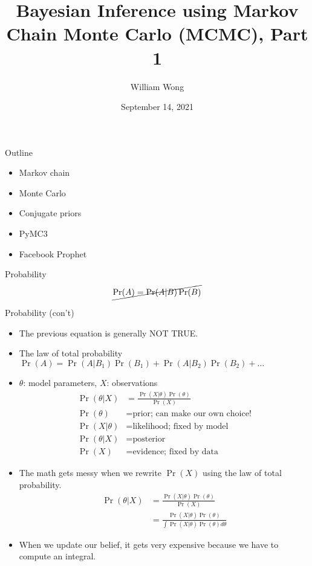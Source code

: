 \documentclass[20pt]{beamer}
\title{Bayesian Inference using Markov Chain Monte Carlo (MCMC), Part 1}
\date{September 14, 2021}
\author{William Wong}
\begin{document}
\begin{frame}
  \titlepage
\end{frame}



\begin{frame}{Outline}
\begin{itemize}
\item Markov chain

\item Monte Carlo

\item Conjugate priors

\item PyMC3

\item Facebook Prophet
\end{itemize}
\end{frame}



\begin{frame}{Probability}
\begin{align*}
  \cancel{\Pr( A ) = \Pr(A | B) \Pr(B)}
\end{align*}
\end{frame}


\begin{frame}{Probability (con't)}
\begin{itemize}
  \item The previous equation is generally NOT TRUE.

  \item The law of total probability $\Pr( A ) = \Pr(A | B_1) \Pr(B_1) + \Pr(A | B_2) \Pr(B_2) + \ldots$

  \item $\theta$: model parameters, $X$: observations
    \begin{align*}
    \Pr( \theta | X ) & = \frac{\Pr( X | \theta) \Pr( \theta )}
      {\Pr( X )} \\
    \Pr( \theta ) & = \text{prior; can make our own choice!} \\
    \Pr( X | \theta ) & = \text{likelihood; fixed by model} \\
    \Pr( \theta | X ) & = \text{posterior} \\
    \Pr( X ) & = \text{evidence; fixed by data}
    \end{align*}

  \item The math gets messy when we rewrite $\Pr(X)$ using the law of total probability.
    \begin{align*}
    \Pr( \theta | X ) & = \frac{\Pr( X | \theta) \Pr( \theta )}
      {\Pr( X )} \\
      & = \frac{\Pr( X | \theta) \Pr( \theta )}
        {\int \Pr(X | \theta) \Pr(\theta) d\theta}
    \end{align*}
  \item When we update our belief, it gets very expensive because we have to compute an integral.
\end{itemize}
\end{frame}
\end{document}
